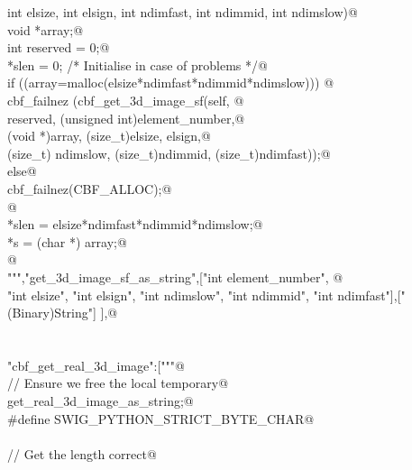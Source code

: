 \documentclass[10pt,a4paper,twoside,notitlepage]{article}
\begin{document}
\begin{flushleft}
\begin{minipage}{\linewidth}
\begin{list}{}{}
\mbox{}\verb@    int elsize, int elsign, int ndimfast, int ndimmid, int ndimslow){@\\
\mbox{}\verb@        void *array;@\\
\mbox{}\verb@        int reserved = 0;@\\
\mbox{}\verb@        *slen = 0; /* Initialise in case of problems */@\\
\mbox{}\verb@        if ((array=malloc(elsize*ndimfast*ndimmid*ndimslow))) {@\\
\mbox{}\verb@               cbf_failnez (cbf_get_3d_image_sf(self, @\\
\mbox{}\verb@               reserved, (unsigned int)element_number,@\\
\mbox{}\verb@               (void *)array, (size_t)elsize, elsign,@\\
\mbox{}\verb@               (size_t) ndimslow, (size_t)ndimmid, (size_t)ndimfast));@\\
\mbox{}\verb@         }else{@\\
\mbox{}\verb@               cbf_failnez(CBF_ALLOC);@\\
\mbox{}\verb@         }@\\
\mbox{}\verb@        *slen = elsize*ndimfast*ndimmid*ndimslow;@\\
\mbox{}\verb@        *s = (char *) array;@\\
\mbox{}\verb@      }@\\
\mbox{}\verb@""","get_3d_image_sf_as_string",["int element_number", @\\
\mbox{}\verb@    "int elsize", "int elsign", "int ndimslow", "int ndimmid", "int ndimfast"],["(Binary)String"] ],@\\
\mbox{}\verb@@\\
\mbox{}\verb@@\\
\mbox{}\verb@"cbf_get_real_3d_image":["""@\\
\mbox{}\verb@// Ensure we free the local temporary@\\
\mbox{}\verb@%cstring_output_allocate_size(char ** s, int *slen, free(*$1))@\\
\mbox{}\verb@       get_real_3d_image_as_string;@\\
\mbox{}\verb@%{@\\
\mbox{}\verb@#define SWIG_PYTHON_STRICT_BYTE_CHAR@\\
\mbox{}\verb@%}@\\
\mbox{}\verb@@\\
\mbox{}\verb@// Get the length correct@\\
\mbox{}\verb@@\\

\end{list}
\end{minipage}
\end{flushleft}
\end{document}
